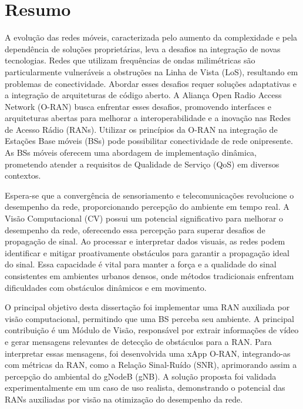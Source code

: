 \chapter*{Resumo}
A evolução das redes móveis, caracterizada pelo aumento da complexidade e pela dependência de soluções proprietárias, leva a desafios na integração de novas tecnologias.
Redes que utilizam frequências de ondas milimétricas são particularmente vulneráveis a obstruções na Linha de Vista (LoS), resultando em problemas de conectividade.
Abordar esses desafios requer soluções adaptativas e a integração de arquiteturas de código aberto.
A Aliança Open Radio Access Network (O-RAN) busca enfrentar esses desafios, promovendo interfaces e arquiteturas abertas para melhorar a interoperabilidade e a inovação nas Redes de Acesso Rádio (RANs).
Utilizar os princípios da O-RAN na integração de Estações Base móveis (BSs) pode possibilitar conectividade de rede onipresente.
As BSs móveis oferecem uma abordagem de implementação dinâmica, prometendo atender a requisitos de Qualidade de Serviço (QoS) em diversos contextos.

Espera-se que a convergência de sensoriamento e telecomunicações revolucione o desempenho da rede, proporcionando percepção do ambiente em tempo real.
A Visão Computacional (CV) possui um potencial significativo para melhorar o desempenho da rede, oferecendo essa percepção para superar desafios de propagação de sinal.
Ao processar e interpretar dados visuais, as redes podem identificar e mitigar proativamente obstáculos para garantir a propagação ideal do sinal.
Essa capacidade é vital para manter a força e a qualidade do sinal consistentes em ambientes urbanos densos, onde métodos tradicionais enfrentam dificuldades com obstáculos dinâmicos e em movimento.

O principal objetivo desta dissertação foi implementar uma RAN auxiliada por visão computacional, permitindo que uma BS perceba seu ambiente.
A principal contribuição é um Módulo de Visão, responsável por extrair informações de vídeo e gerar mensagens relevantes de detecção de obstáculos para a RAN.
Para interpretar essas mensagens, foi desenvolvida uma xApp O-RAN, integrando-as com métricas da RAN, como a Relação Sinal-Ruído (SNR), aprimorando assim a percepção do ambiental do gNodeB (gNB).
A solução proposta foi validada experimentalmente em um caso de uso realista, demonstrando o potencial das RANs auxiliadas por visão na otimização do desempenho da rede.